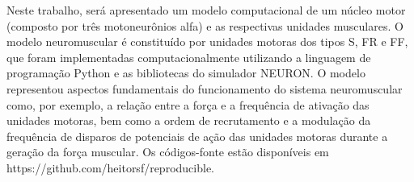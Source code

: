 Neste trabalho, será apresentado um modelo computacional de um núcleo motor (composto por três motoneurônios alfa) e as respectivas unidades musculares. O modelo neuromuscular é constituído por unidades motoras dos tipos S, FR e FF, que foram implementadas computacionalmente utilizando a linguagem de programação Python e as bibliotecas do simulador NEURON. O modelo representou aspectos fundamentais do funcionamento do sistema neuromuscular como, por exemplo, a relação entre a força e a frequência de ativação das unidades motoras, bem como a ordem de recrutamento e a modulação da frequência de disparos de potenciais de ação das unidades motoras durante a geração da força muscular. Os códigos-fonte estão disponíveis em https://github.com/heitorsf/reproducible.